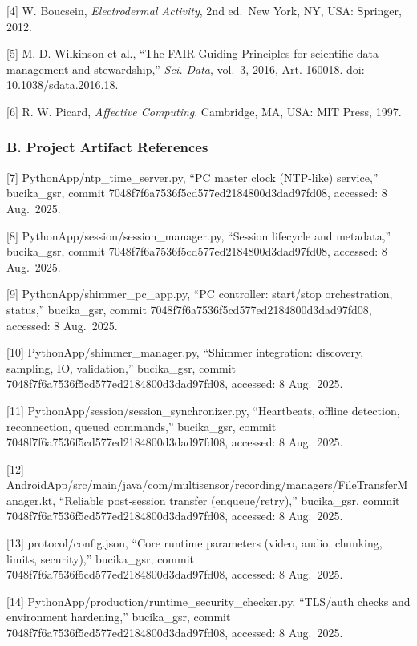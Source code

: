 \documentclass[12pt,a4paper]{article}
\begin{document}
{[}4{]} W. Boucsein, \emph{Electrodermal Activity}, 2nd ed.~New York, NY, USA: Springer, 2012.

{[}5{]} M. D. Wilkinson et al., ``The FAIR Guiding Principles for scientific data management and stewardship,'' \emph{Sci. Data}, vol.~3, 2016, Art. 160018. doi: 10.1038/sdata.2016.18.

{[}6{]} R. W. Picard, \emph{Affective Computing}. Cambridge, MA, USA: MIT Press, 1997.

\subsubsection{B. Project Artifact References}\label{b.-project-artifact-references}

{[}7{]} PythonApp/ntp\_time\_server.py, ``PC master clock (NTP-like) service,'' bucika\_gsr, commit 7048f7f6a7536f5cd577ed2184800d3dad97fd08, accessed: 8 Aug.~2025.

{[}8{]} PythonApp/session/session\_manager.py, ``Session lifecycle and metadata,'' bucika\_gsr, commit 7048f7f6a7536f5cd577ed2184800d3dad97fd08, accessed: 8 Aug.~2025.

{[}9{]} PythonApp/shimmer\_pc\_app.py, ``PC controller: start/stop orchestration, status,'' bucika\_gsr, commit 7048f7f6a7536f5cd577ed2184800d3dad97fd08, accessed: 8 Aug.~2025.

{[}10{]} PythonApp/shimmer\_manager.py, ``Shimmer integration: discovery, sampling, IO, validation,'' bucika\_gsr, commit 7048f7f6a7536f5cd577ed2184800d3dad97fd08, accessed: 8 Aug.~2025.

{[}11{]} PythonApp/session/session\_synchronizer.py, ``Heartbeats, offline detection, reconnection, queued commands,'' bucika\_gsr, commit 7048f7f6a7536f5cd577ed2184800d3dad97fd08, accessed: 8 Aug.~2025.

{[}12{]} AndroidApp/src/main/java/com/multisensor/recording/managers/FileTransferManager.kt, ``Reliable post‑session transfer (enqueue/retry),'' bucika\_gsr, commit 7048f7f6a7536f5cd577ed2184800d3dad97fd08, accessed: 8 Aug.~2025.

{[}13{]} protocol/config.json, ``Core runtime parameters (video, audio, chunking, limits, security),'' bucika\_gsr, commit 7048f7f6a7536f5cd577ed2184800d3dad97fd08, accessed: 8 Aug.~2025.

{[}14{]} PythonApp/production/runtime\_security\_checker.py, ``TLS/auth checks and environment hardening,'' bucika\_gsr, commit 7048f7f6a7536f5cd577ed2184800d3dad97fd08, accessed: 8 Aug.~2025.
\end{document}
